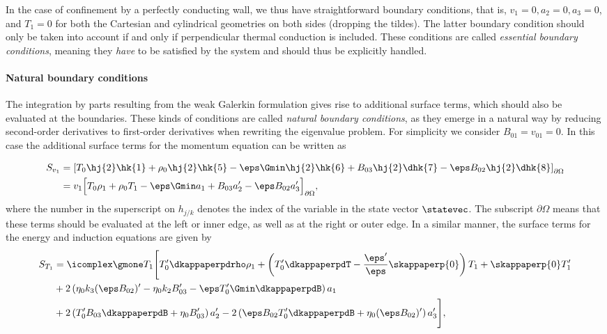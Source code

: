 In the case of confinement by a perfectly conducting wall, we thus have straightforward boundary conditions, that is, $v_1 = 0, a_2 = 0, a_3 = 0$, and $T_1 = 0$ for both the Cartesian and cylindrical geometries on both sides (dropping the tildes). The latter boundary condition should only be taken into account if and only if perpendicular thermal conduction is included. These conditions are called \emph{essential boundary conditions}, meaning they \emph{have} to be satisfied by the system and should thus be explicitly handled.

\paragraph{Natural boundary conditions}
The integration by parts resulting from the weak Galerkin formulation gives rise to additional surface terms, which should also be evaluated at the boundaries. These kinds of conditions are called \emph{natural boundary conditions}, as they emerge in a natural way by reducing second-order derivatives to first-order derivatives when rewriting the eigenvalue problem. For simplicity we consider $B_{01} = v_{01} = 0$. In this case the additional surface terms for the momentum equation can be written as

\begin{equation} \label{eq: natural_boundary_v1}
  \begin{aligned}
    S_{v_1} &= \left[
      T_0 \hj{2}\hk{1}
      + \rho_0\hj{2}\hk{5}
      - \eps \Gmin \hj{2}\hk{6}
      + B_{03}\hj{2}\dhk{7}
      - \eps B_{02}\hj{2}\dhk{8}
    \right]_{\partial \Omega} \\
    &= v_1 \Bigl[
      T_0 \rho_1
      + \rho_0 T_1
      - \eps \Gmin a_1
      + B_{03}a_2'
      - \eps B_{02}a_3'
    \Bigr]_{\partial \Omega},
  \end{aligned}
\end{equation}
where the number in the superscript on $h_{j/k}$ denotes the index of the variable in the state vector $\statevec$.
The subscript $\partial \Omega$ means that these terms should be evaluated at the left or inner edge, as well as at the right or outer edge. In a similar manner, the surface terms for the energy and induction equations are given by
\begin{equation} \label{eq: natural_boundary_T1}
  \begin{aligned}
    S_{T_1} &= \icomplex \gmone T_1\Biggl[
      T_0'\dkappaperpdrho \rho_1
      + \left(T_0'\dkappaperpdT - \frac{\eps'}{\eps}\skappaperp{0}\right)T_1
      + \skappaperp{0}T_1'
    \Biggr. \\
    &+ 2\left(\eta_0 k_3 (\eps B_{02})' - \eta_0 k_2 B_{03}' - \eps T_0' \Gmin \dkappaperpdB\right)a_1 \\
    &+ 2\left(T_0' B_{03} \dkappaperpdB + \eta_0 B_{03}'\right)a_2'
     - 2\left(\eps B_{02}T_0'\dkappaperpdB + \eta_0 (\eps B_{02})'\right)a_3'
    \Biggr],
  \end{aligned}
\end{equation}

